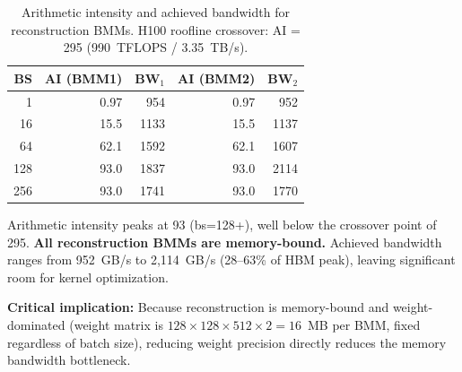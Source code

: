 \documentclass[10pt,twocolumn]{article}
\begin{document}
\begin{table}[h]
\centering
\small
\caption{Arithmetic intensity and achieved bandwidth for reconstruction BMMs.  H100 roofline crossover: AI = 295 (990~TFLOPS / 3.35~TB/s).}
\label{tab:roofline}
\begin{tabular}{@{}rrrrr@{}}
\toprule
BS & AI (BMM1) & BW$_1$ & AI (BMM2) & BW$_2$ \\
\midrule
  1 & 0.97 &  954 & 0.97 &  952 \\
 16 & 15.5 & 1133 & 15.5 & 1137 \\
 64 & 62.1 & 1592 & 62.1 & 1607 \\
128 & 93.0 & 1837 & 93.0 & 2114 \\
256 & 93.0 & 1741 & 93.0 & 1770 \\
\bottomrule
\end{tabular}
\end{table}

Arithmetic intensity peaks at 93 (bs=128+), well below the crossover point of 295.  \textbf{All reconstruction BMMs are memory-bound.}  Achieved bandwidth ranges from 952~GB/s to 2,114~GB/s (28--63\% of HBM peak), leaving significant room for kernel optimization.

\textbf{Critical implication:}  Because reconstruction is memory-bound and weight-dominated (weight matrix is $128 \times 128 \times 512 \times 2 = 16$~MB per BMM, fixed regardless of batch size), reducing weight precision directly reduces the memory bandwidth bottleneck.
\end{document}
